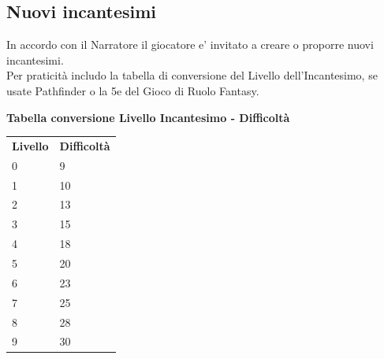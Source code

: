\begin{multicols}{2}
\subsection{Nuovi incantesimi}

In accordo con il Narratore il giocatore e' invitato a creare o proporre nuovi incantesimi.\\
Per praticità includo la tabella di conversione del Livello dell'Incantesimo, se usate Pathfinder o la 5e del Gioco di Ruolo Fantasy.\\

\medskip

\textbf{Tabella conversione Livello Incantesimo - Difficoltà}

\medskip

\begin{tabular}{ll}
\textbf{Livello} & \textbf{Difficoltà}\\
0	& 9\\
1	& 10\\
2	& 13\\
3	& 15\\
4	& 18\\
5	& 20\\
6	& 23\\
7	& 25\\
8	& 28\\
9	& 30\\
\end{tabular}
\end{multicols}
